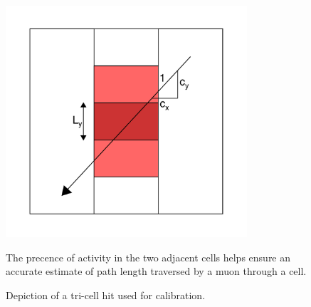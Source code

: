 \begin{figure}[t]
\begin{center}
\includegraphics[width=0.8\textwidth]{figures/plots/reco/calib_tricell}
\end{center}
\caption{Depiction of a tri-cell hit used for calibration.}{The precence of
activity in the two adjacent cells helps ensure an accurate estimate of
path length traversed by a muon through a cell.}
\label{calib_tricell}
\end{figure}

